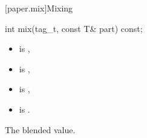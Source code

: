 [paper.mix]{Mixing}

%
\begin{itemdecl}
int mix(tag_t, const T& part) const;
\end{itemdecl}

\begin{itemdescr}
\pnum
\constraints
\begin{itemize}
\item {} is ,
\item {} is ,
\item {} is ,
\item {} is .
\end{itemize}

\pnum
\returns
The blended value.
\end{itemdescr}
